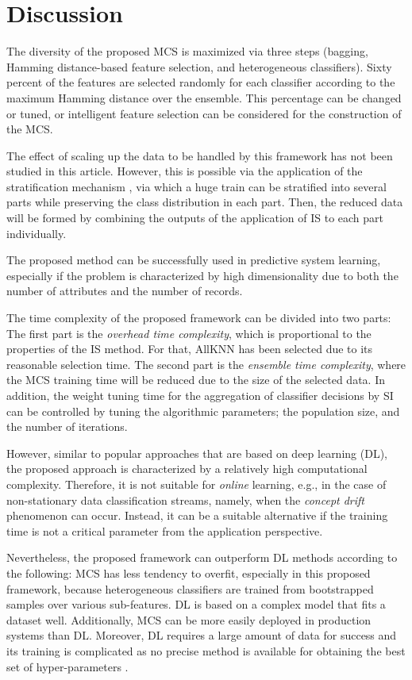 
\section{Discussion}
 \label{sec:4_7_Discussion}
The diversity of the proposed MCS is maximized via three steps (bagging, Hamming distance-based feature selection, and heterogeneous classifiers). Sixty percent of the features are selected randomly for each classifier according to the maximum Hamming distance over the ensemble. This percentage can be changed or tuned, or intelligent feature selection can be considered for the construction of the MCS.   

The effect of scaling up the data to be handled by this framework has not been studied in this article. However, this is possible via the application of the stratification mechanism \cite{garcia2011}, via which a huge train can be stratified into several parts while preserving the class distribution in each part. Then, the reduced data will be formed by combining the outputs of the application of IS to each part individually. 


The proposed method can be successfully used in predictive system learning, especially if the problem is characterized by high dimensionality due to both the number of attributes and the number of records. 

The time complexity of the proposed framework can be divided into two parts: The first part is the \textit{overhead time complexity}, which is proportional to the properties of the IS method. For that, AllKNN has been selected due to its reasonable selection time. The second part is the \textit{ensemble time complexity}, where the MCS training time will be reduced due to the size of the selected data. In addition, the weight tuning time for the aggregation of classifier decisions by SI can be controlled by tuning the algorithmic parameters; the population size, and the number of iterations.

However, similar to popular approaches that are based on deep learning (DL), the proposed approach is characterized by a relatively high computational complexity. Therefore, it is not suitable for \emph{online} learning, e.g., in the case of non-stationary data classification streams, namely, when the \emph{concept drift} phenomenon can occur. Instead, it can be a suitable alternative if the training time is not a critical parameter from the application perspective.


Nevertheless, the proposed framework can outperform DL methods according to the following: MCS has less tendency to overfit, especially in this proposed framework, because heterogeneous classifiers are trained from bootstrapped samples over various sub-features. DL is based on a complex model that fits a dataset well. Additionally, MCS can be more easily deployed in production systems than DL. Moreover, DL requires a large amount of data for success and its training is complicated as no precise method is available for obtaining the best set of hyper-parameters \cite{litjens2017}.
